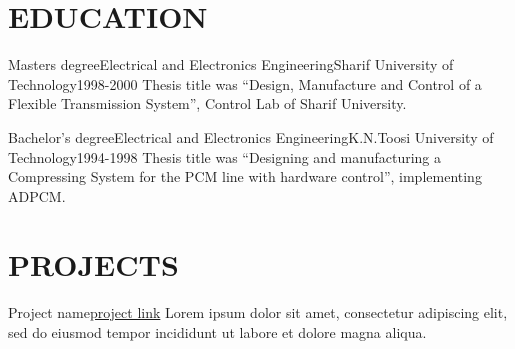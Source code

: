 \documentclass[10pt, a4paper]{article}
\begin{document}
\section{EDUCATION}

\begin{cvitem}{Masters degree}{Electrical and Electronics Engineering}{Sharif University of Technology}{1998-2000}
    Thesis title was “Design, Manufacture and Control of a Flexible Transmission System”, Control Lab of Sharif University.
\end{cvitem}

\begin{cvitem}{Bachelor's degree}{Electrical and Electronics Engineering}{K.N.Toosi University of Technology}{1994-1998}
    Thesis title was “Designing and manufacturing a Compressing System for the PCM line with hardware control”, implementing ADPCM.
\end{cvitem}


%
%

\section{PROJECTS}


\begin{projitem}{Project name}{\href{https://link}{project link}}
    Lorem ipsum dolor sit amet, consectetur adipiscing elit, sed do eiusmod tempor incididunt ut labore et dolore magna aliqua.
\end{projitem}


\fincols
\end{document}
